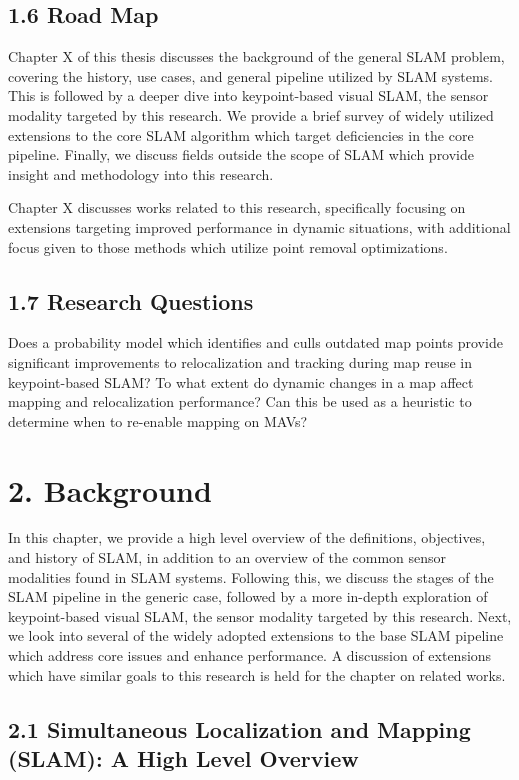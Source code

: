 \documentclass[12pt]{article}
\begin{document}
\subsection{1.6 Road Map}

Chapter X of this thesis discusses the background of the general SLAM problem, covering the history, use cases, and general pipeline utilized by SLAM systems. This is followed by a deeper dive into keypoint-based visual SLAM, the sensor modality targeted by this research. We provide a brief survey of widely utilized extensions to the core SLAM algorithm which target deficiencies in the core pipeline. Finally, we discuss fields outside the scope of SLAM which provide insight and methodology into this research.

Chapter X discusses works related to this research, specifically focusing on extensions targeting improved performance in dynamic situations, with additional focus given to those methods which utilize point removal optimizations.

\subsection{1.7 Research Questions}

Does a probability model which identifies and culls outdated map points provide significant improvements to relocalization and tracking during map reuse in keypoint-based SLAM?
To what extent do dynamic changes in a map affect mapping and relocalization performance?
Can this be used as a heuristic to determine when to re-enable mapping on MAVs?

\section{2. Background}

In this chapter, we provide a high level overview of the definitions, objectives, and history of SLAM, in addition to an overview of the common sensor modalities found in SLAM systems. Following this, we discuss the stages of the SLAM pipeline in the generic case, followed by a more in-depth exploration of keypoint-based visual SLAM, the sensor modality targeted by this research. Next, we look into several of the widely adopted extensions to the base SLAM pipeline which address core issues and enhance performance. A discussion of extensions which have similar goals to this research is held for the chapter on related works.

\subsection{2.1 Simultaneous Localization and Mapping (SLAM): A High Level Overview}
\end{document}
